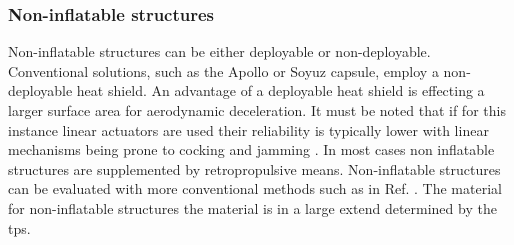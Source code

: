 \subsubsection{Non-inflatable structures}
Non-inflatable structures can be either deployable or non-deployable. Conventional solutions, such as the Apollo or Soyuz capsule, employ a non-deployable heat shield. An advantage of a deployable heat shield is effecting a larger surface area for aerodynamic deceleration. It must be noted that if for this instance linear actuators are used their reliability is typically lower with linear mechanisms being prone to cocking and jamming \cite[p.683]{Wertz2011}. In most cases non inflatable structures are supplemented by retropropulsive means. Non-inflatable structures can be evaluated with more conventional methods such as in Ref. \cite{Megson2012}. The material for non-inflatable structures the material is in a large extend determined by the \gls{tps}. 











